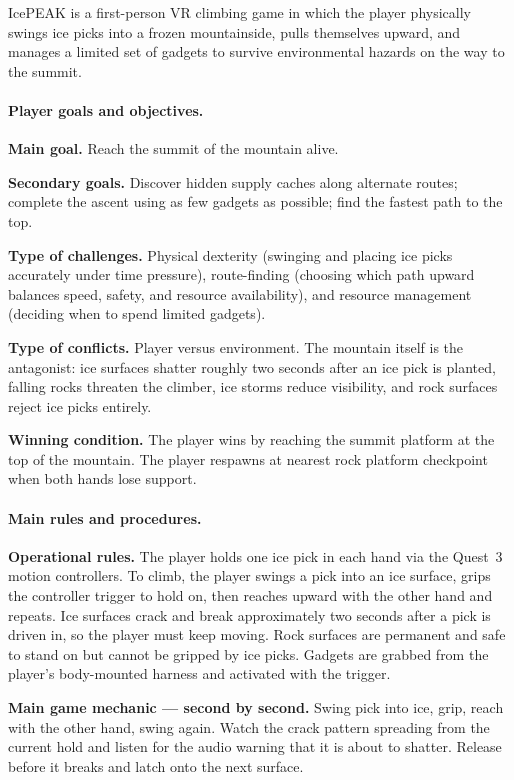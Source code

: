 \documentclass[12pt]{article}
\begin{document}
IcePEAK is a first-person VR climbing game in which the player physically swings ice picks into a frozen mountainside, pulls themselves upward, and manages a limited set of gadgets to survive environmental hazards on the way to the summit.

\paragraph{Player goals and objectives.}

\textbf{Main goal.} Reach the summit of the mountain alive.

\textbf{Secondary goals.} Discover hidden supply caches along alternate routes; complete the ascent using as few gadgets as possible; find the fastest path to the top.

\textbf{Type of challenges.} Physical dexterity (swinging and placing ice picks accurately under time pressure), route-finding (choosing which path upward balances speed, safety, and resource availability), and resource management (deciding when to spend limited gadgets).

\textbf{Type of conflicts.} Player versus environment. The mountain itself is the antagonist: ice surfaces shatter roughly two seconds after an ice pick is planted, falling rocks threaten the climber, ice storms reduce visibility, and rock surfaces reject ice picks entirely.

\textbf{Winning condition.} The player wins by reaching the summit platform at the top of the mountain. The player respawns at nearest rock platform checkpoint when both hands lose support.

\paragraph{Main rules and procedures.}

\textbf{Operational rules.} The player holds one ice pick in each hand via the Quest~3 motion controllers. To climb, the player swings a pick into an ice surface, grips the controller trigger to hold on, then reaches upward with the other hand and repeats. Ice surfaces crack and break approximately two seconds after a pick is driven in, so the player must keep moving. Rock surfaces are permanent and safe to stand on but cannot be gripped by ice picks. Gadgets are grabbed from the player's body-mounted harness and activated with the trigger.

\textbf{Main game mechanic --- second by second.} Swing pick into ice, grip, reach with the other hand, swing again. Watch the crack pattern spreading from the current hold and listen for the audio warning that it is about to shatter. Release before it breaks and latch onto the next surface.
\end{document}
